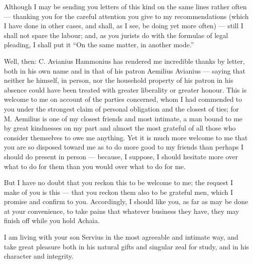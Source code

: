 

 Although I may be sending you letters of this kind on the same lines rather often --- thanking you for the careful attention you give to my recommendations (which I have done in other cases, and shall, as I see, be doing yet more often) --- still I shall not spare the labour; and, as you jurists do with the formulae of legal pleading, I shall put it ``On the same matter, in another mode.''

 Well, then: C. Avianius Hammonius has rendered me incredible thanks by letter, both in his own name and in that of his patron Aemilius Avianius --- saying that neither he himself, in person, nor the household property of his patron in his absence could have been treated with greater liberality or greater honour. This is welcome to me on account of the parties concerned, whom I had commended to you under the strongest claim of personal obligation and the closest of ties; for M. Aemilius is one of my closest friends and most intimate, a man bound to me by great kindnesses on my part and almost the most grateful of all those who consider themselves to owe me anything. Yet it is much more welcome to me that you are so disposed toward me as to do more good to my friends than perhaps I should do present in person --- because, I suppose, I should hesitate more over what to do for them than you would over what to do for me.

 But I have no doubt that you reckon this to be welcome to me; the request I make of you is this --- that you reckon them also to be grateful men, which I promise and confirm to you. Accordingly, I should like you, as far as may be done at your convenience, to take pains that whatever business they have, they may finish off while you hold Achaia.

 I am living with your son Servius in the most agreeable and intimate way, and take great pleasure both in his natural gifts and singular zeal for study, and in his character and integrity.
